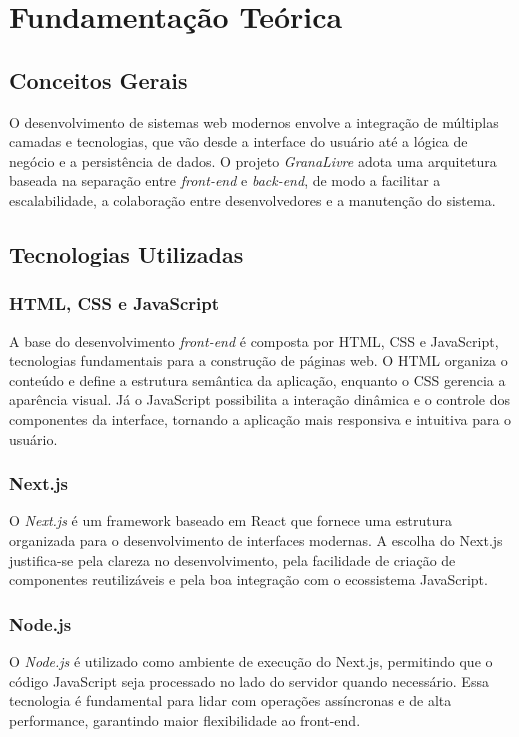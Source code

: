 \chapter{Fundamentação Teórica}\label{cap:fund_teorica}

\section{Conceitos Gerais}

O desenvolvimento de sistemas web modernos envolve a integração de múltiplas camadas e tecnologias, que vão desde a interface do usuário até a lógica de negócio e a persistência de dados. O projeto \textit{GranaLivre} adota uma arquitetura baseada na separação entre \textit{front-end} e \textit{back-end}, de modo a facilitar a escalabilidade, a colaboração entre desenvolvedores e a manutenção do sistema.

\section{Tecnologias Utilizadas}

\subsection{HTML, CSS e JavaScript}
A base do desenvolvimento \textit{front-end} é composta por HTML, CSS e JavaScript, tecnologias fundamentais para a construção de páginas web.  
O HTML organiza o conteúdo e define a estrutura semântica da aplicação, enquanto o CSS gerencia a aparência visual. Já o JavaScript possibilita a interação dinâmica e o controle dos componentes da interface, tornando a aplicação mais responsiva e intuitiva para o usuário.

\subsection{Next.js}
O \textit{Next.js} é um framework baseado em React que fornece uma estrutura organizada para o desenvolvimento de interfaces modernas.  
A escolha do Next.js justifica-se pela clareza no desenvolvimento, pela facilidade de criação de componentes reutilizáveis e pela boa integração com o ecossistema JavaScript.

\subsection{Node.js}
O \textit{Node.js} é utilizado como ambiente de execução do Next.js, permitindo que o código JavaScript seja processado no lado do servidor quando necessário. Essa tecnologia é fundamental para lidar com operações assíncronas e de alta performance, garantindo maior flexibilidade ao front-end.

